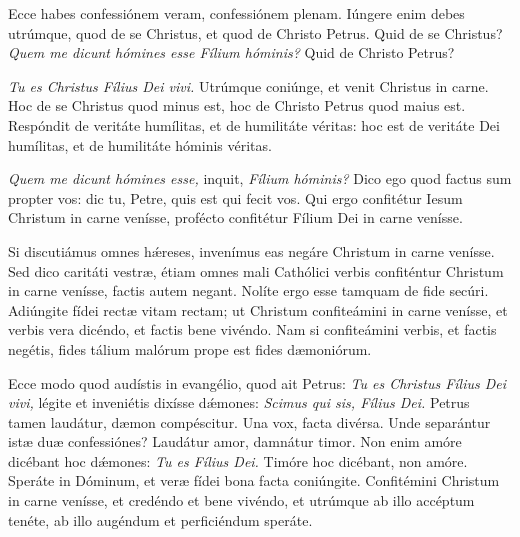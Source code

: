 {{\noindent Ecce habes confessiónem veram, confessiónem plenam. Iúngere enim debes utrúmque, quod de se Christus, et quod de Christo Petrus. Quid de se Christus? \emph{Quem me dicunt hómines esse Fílium hóminis?} Quid de Christo Petrus?

\noindent \emph{Tu es Christus Fílius Dei vivi.} Utrúmque coniúnge, et venit Christus in carne. Hoc de se Christus quod minus est, hoc de Christo Petrus quod maius est. Respóndit de veritáte humílitas, et de humilitáte véritas: hoc est de veritáte Dei humílitas, et de humilitáte hóminis véritas.}

\noindent \emph{Quem me dicunt hómines esse,} inquit, \emph{Fílium hóminis?} Dico ego quod factus sum propter vos: dic tu, Petre, quis est qui fecit vos. Qui ergo confitétur Iesum Christum in carne venísse, profécto confitétur Fílium Dei in carne venísse.

\noindent Si discutiámus omnes hǽreses, invenímus eas negáre Christum in carne venísse. Sed dico caritáti vestræ, étiam omnes mali Cathólici verbis confiténtur Christum in carne venísse, factis autem negant. Nolíte ergo esse tamquam de fide secúri. Adiúngite fídei rectæ vitam rectam; ut Christum confiteámini in carne venísse, et verbis vera dicéndo, et factis bene vivéndo. Nam si confiteámini verbis, et factis negétis, fides tálium malórum prope est fides dæmoniórum.

\noindent Ecce modo quod audístis in evangélio, quod ait Petrus: \emph{Tu es Christus Fílius Dei vivi,} légite et inveniétis dixísse dǽmones: \emph{Scimus qui sis, Fílius Dei.} Petrus tamen laudátur, dæmon compéscitur. Una vox, facta divérsa. Unde separántur istæ duæ confessiónes? Laudátur amor, damnátur timor. Non enim amóre dicébant hoc dǽmones: \emph{Tu es Fílius Dei.} Timóre hoc dicébant, non amóre. Speráte in Dóminum, et veræ fídei bona facta coniúngite. Confitémini Christum in carne venísse, et credéndo et bene vivéndo, et utrúmque ab illo accéptum tenéte, ab illo augéndum et perficiéndum speráte.

\vfill
\pagebreak

 

\vspace{-5mm}


\vfill
\pagebreak
}
\newcommand{\responsoriumbreve}{\pars{Responsorium breve.}

\cuminitiali{VI}{temporalia/resp-christefilidei.gtex}}
